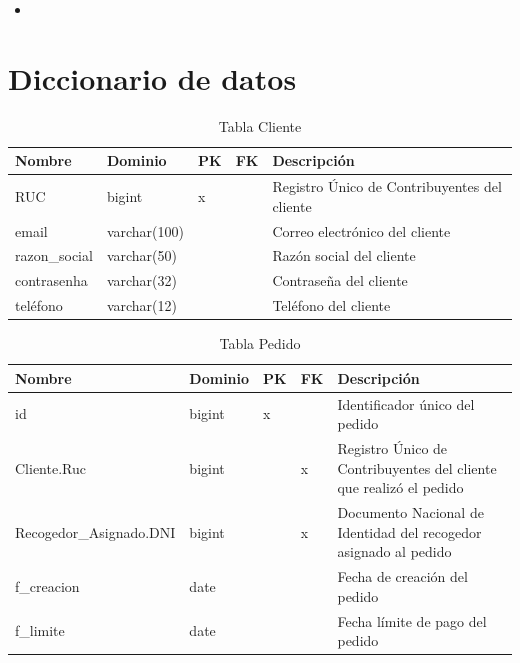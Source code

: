 \documentclass[10pt, a4paper,openany]{report}
\begin{document}
\begin{itemize}
  \item 
\end{itemize}



\section{Diccionario de datos} %
\label{sec:Diccionario de datos}

\begin{table}[h]
\centering
\begin{tabular}{|l|p{2cm}|p{0.5cm}|p{0.5cm}|p{3cm}|}
\hline
\textbf{Nombre} &
\textbf{Dominio} &
\textbf{PK} &
\textbf{FK} &
\textbf{Descripción} \\
\hline
RUC & bigint & x & & Registro Único de Contribuyentes del cliente \\
\hline
email & varchar(100) & & & Correo electrónico del cliente \\
\hline
razon\_social & varchar(50) & & & Razón social del cliente \\
\hline
contrasenha & varchar(32) & & & Contraseña del cliente \\
\hline
teléfono & varchar(12) & & & Teléfono del cliente \\
\hline
\end{tabular}
\caption{Tabla Cliente}
\end{table}


\begin{table}[h]
	\centering
	\begin{tabular}{|l|p{1.5cm}|p{0.5cm}|p{0.5cm}|p{3cm}|}
		\hline
		\textbf{Nombre}         &
		\textbf{Dominio}        &
		\textbf{PK}             &
		\textbf{FK}             &
		\textbf{Descripción}                                                                                          \\
		\hline
		id                      & bigint & x &   & Identificador único del pedido                                     \\
		\hline
		Cliente.Ruc             & bigint &   & x & Registro Único de Contribuyentes del cliente que realizó el pedido \\
		\hline
		Recogedor\_Asignado.DNI & bigint &   & x & Documento Nacional de Identidad del recogedor asignado al pedido   \\
		\hline
		f\_creacion             & date   &   &   & Fecha de creación del pedido                                       \\
		\hline
		f\_limite               & date   &   &   & Fecha límite de pago del pedido                                    \\
		\hline
	\end{tabular}
	\caption{Tabla Pedido}
\end{table}
\end{document}
